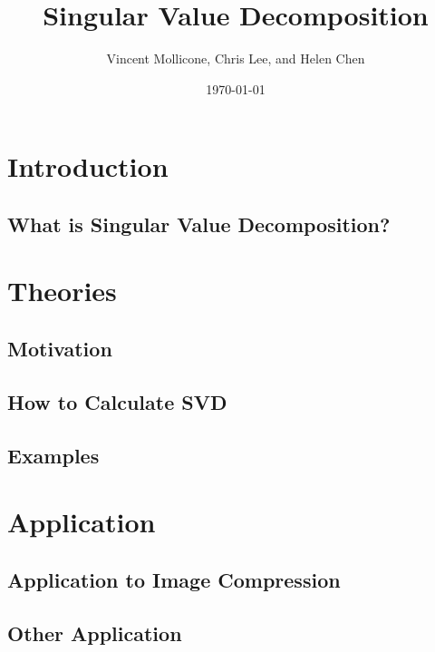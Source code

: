 \documentclass{article}
\title{Singular Value Decomposition}
\author{Vincent Mollicone, Chris Lee, and Helen Chen}
\date{\today}
\begin{document}
\maketitle

\section{Introduction}
\subsection{What is Singular Value Decomposition?}


\section{Theories}
\subsection{Motivation}

\subsection{How to Calculate SVD}

\subsection{Examples}

\section{Application}
\subsection{Application to Image Compression}

\subsection{Other Application}
\end{document}
